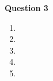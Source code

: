 \documentclass[12pt]{article}
\begin{document}
\begin{onehalfspace}
\textbf{Question 3}\\
\begin{enumerate}[1.]
	\item
	\item
	\item
	\item
	\item
\end{enumerate}
\end{onehalfspace}
\end{document}
